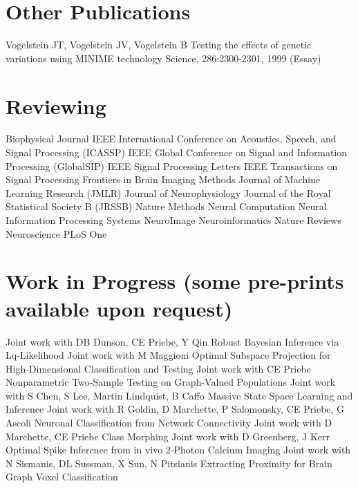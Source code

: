 \documentclass[10pt,colorlinks=true,urlcolor=blue]{moderncv}
\begin{document}
\section{Other Publications}
\cventry {} {Vogelstein JT, Vogelstein JV, Vogelstein B} {Testing the effects of genetic variations using MINIME technology} {Science, 286:2300-2301, 1999 (Essay)} {} {} 

\section{Reviewing}
\cventry {} {Biophysical Journal} {}{}{}{}
\cventry {} {IEEE International Conference on Acoustics, Speech, and Signal Processing (ICASSP)} {}{}{}{}
\cventry {} {IEEE Global Conference on Signal and Information Processing (GlobalSIP)} {} {} {} {}
\cventry {} {IEEE Signal Processing Letters} {} {} {} {} 
\cventry {} {IEEE Transactions on Signal Processing} {}{}{}{}
\cventry {} {Frontiers in Brain Imaging Methods} {}{}{}{}
\cventry {} {Journal of Machine Learning Research (JMLR)} {}{}{}{}
\cventry {} {Journal of Neurophysiology} {}{}{}{}
\cventry {} {Journal of the Royal Statistical Society B (JRSSB)} {}{}{}{}
\cventry {} {Nature Methods} {}{}{}{}
\cventry {} {Neural Computation} {}{}{}{}
\cventry {} {Neural Information Processing Systems} {}{}{}{}
\cventry {} {NeuroImage} {}{}{}{}
\cventry {} {Neuroinformatics} {}{}{}{}
\cventry {} {Nature Reviews Neuroscience} {}{}{}{}
\cventry {} {PLoS One} {}{}{}{}


\section{Work in Progress (some pre-prints available upon request)}
\cventry {} {Joint work with DB Dunson, CE Priebe, Y Qin} {Robust Bayesian Inference via Lq-Likelihood} {}{}{}
\cventry {} {Joint work with M Maggioni} {Optimal Subspace Projection for High-Dimensional Classification and Testing} {} {} {}
\cventry {} {Joint work with CE Priebe} {Nonparametric Two-Sample Testing on Graph-Valued Populations} {} {} {}
\cventry {} {Joint work with S Chen, S Lee, Martin Lindquist, B Caffo} {Massive State Space Learning and Inference} {} {} {}
\cventry {} {Joint work with R Goldin, D Marchette, P Salomonsky, CE Priebe, G Ascoli} {Neuronal Classification from Network Connectivity} {} {} {}
\cventry {} {Joint work with D Marchette, CE Priebe} {Class Morphing} {} {} {}
\cventry {} {Joint work with D Greenberg, J Kerr} {Optimal Spike Inference from in vivo 2-Photon Calcium Imaging} {} {} {}
\cventry {} {Joint work with N Sismanis, DL Sussman, X Sun, N Pitsianis} {Extracting Proximity for Brain Graph Voxel Classification} {} {} {}
\end{document}
